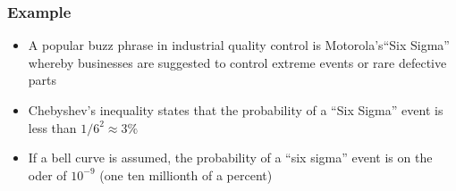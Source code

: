 \documentclass[aspectratio=169]{beamer}
\begin{document}
\begin{frame} \frametitle{Example}
  \begin{itemize}
  \item A popular buzz phrase in industrial quality control is
    Motorola's``Six Sigma'' whereby businesses are suggested to
    control extreme events or rare defective parts
  \item Chebyshev's inequality states that the probability of a ``Six
    Sigma'' event is less than $1/6^2 \approx 3\%$
  \item If a bell curve is assumed, the probability of a ``six sigma''
    event is on the oder of $10^{-9}$ (one ten millionth of a percent)
  \end{itemize}
\end{frame}
\end{document}
